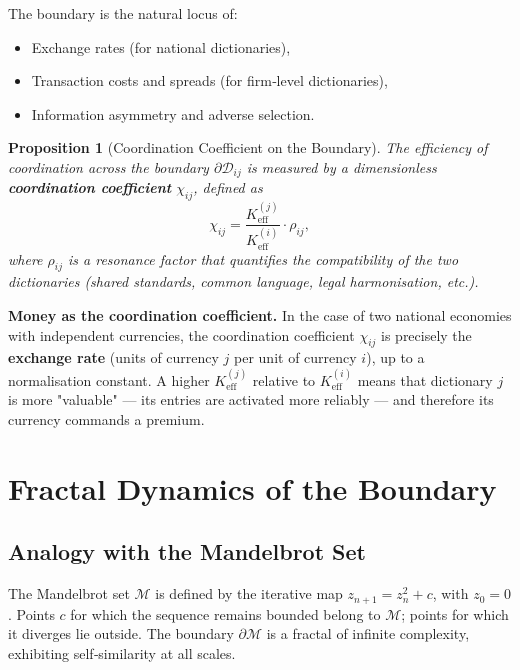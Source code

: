 \documentclass[12pt,a4paper]{article}
\newtheorem{proposition}[theorem]{Proposition}
\theoremstyle{remark}
\begin{document}
	The boundary is the natural locus of:
	\begin{itemize}
		\item Exchange rates (for national dictionaries),
		\item Transaction costs and spreads (for firm‑level dictionaries),
		\item Information asymmetry and adverse selection.
	\end{itemize}
	
	\begin{proposition}[Coordination Coefficient on the Boundary]
		The efficiency of coordination across the boundary \(\partial\mathcal{D}_{ij}\) is measured by a dimensionless \textbf{coordination coefficient} \(\chi_{ij}\), defined as
		\begin{equation}
			\chi_{ij} = \frac{K_{\mathrm{eff}}^{(j)}}{K_{\mathrm{eff}}^{(i)}} \cdot \rho_{ij},
			\label{eq:chi}
		\end{equation}
		where \(\rho_{ij}\) is a resonance factor that quantifies the compatibility of the two dictionaries (shared standards, common language, legal harmonisation, etc.).
	\end{proposition}
	
	\textbf{Money as the coordination coefficient.} In the case of two national economies with independent currencies, the coordination coefficient \(\chi_{ij}\) is precisely the \textbf{exchange rate} (units of currency \(j\) per unit of currency \(i\)), up to a normalisation constant. A higher \(K_{\mathrm{eff}}^{(j)}\) relative to \(K_{\mathrm{eff}}^{(i)}\) means that dictionary \(j\) is more "valuable" — its entries are activated more reliably — and therefore its currency commands a premium.
	
	\section{Fractal Dynamics of the Boundary}
	
	\subsection{Analogy with the Mandelbrot Set}
	
	The Mandelbrot set \(\mathcal{M}\) is defined by the iterative map \(z_{n+1} = z_n^2 + c\), with \(z_0 = 0\). Points \(c\) for which the sequence remains bounded belong to \(\mathcal{M}\); points for which it diverges lie outside. The boundary \(\partial\mathcal{M}\) is a fractal of infinite complexity, exhibiting self‑similarity at all scales.
	
\end{document}
